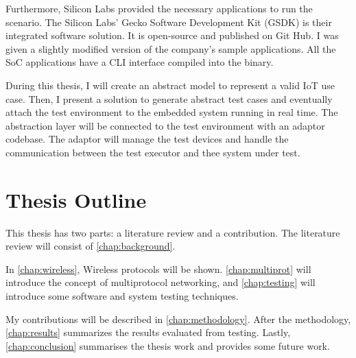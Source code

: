 Furthermore, Silicon Labs provided the necessary applications to run the scenario. The Silicon Labs' Gecko Software Development Kit (GSDK) is their integrated software solution. It is open-source and published on Git Hub\cite{silabs_gsdk:2023}. I was given a slightly modified version of the company's sample applications. All the SoC applications have a CLI interface compiled into the binary.

During this thesis, I will create an abstract model to represent a valid IoT use case. Then, I present a solution to generate abstract test cases and eventually attach the test environment to the embedded system running in real time.  The abstraction layer will be connected to the test environment with an adaptor codebase. The adaptor will manage the test devices and handle the communication between the test executor and thee system under test.

\section{Thesis Outline}

This thesis has two parts: a literature review and a contribution. The literature review will consist of \autoref{chap:background}.

In \autoref{chap:wireless}, Wireless protocols will be shown.
\autoref{chap:multiprot} will introduce the concept of multiprotocol networking, and \autoref{chap:testing} will introduce some software and system testing techniques.

My contributions will be described in \autoref{chap:methodology}. After the methodology, \autoref{chap:results} summarizes the results evaluated from testing. Lastly, \autoref{chap:conclusion} summarises the thesis work and provides some future work.